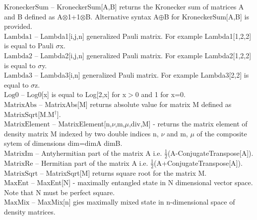 \documentclass[a4paper,11pt]{article}
\begin{document}
\textbf{$ \text{KroneckerSum} $ }-- KroneckerSum[A,B] returns the Kronecker sum of matrices A and B defined as A$\otimes $1+1$\otimes $B. Alternative syntax A$\oplus $B for KroneckerSum[A,B] is provided.$  $\\

\textbf{$ \text{Lambda1} $ }-- Lambda1[i,j,n] generalized Pauli matrix. For example Lambda1[1,2,2] is equal to Pauli $\sigma $x.$  $\\

\textbf{$ \text{Lambda2} $ }-- Lambda2[i,j,n] generalized Pauli matrix. For example Lambda2[1,2,2] is equal to $\sigma $y.$  $\\

\textbf{$ \text{Lambda3} $ }-- Lambda3[i,n] generalized Pauli matrix. For example Lambda3[2,2] is equal to $\sigma $z.$  $\\

\textbf{$ \text{Log0} $ }-- Log0[x] is equal to Log[2,x] for x$>$0 and 1 for x=0.$  $\\

\textbf{$ \text{MatrixAbs} $ }-- MatrixAbs[M] returns absolute value for matrix M defined as MatrixSqrt[M.M$  ^{\dagger }\text{].} $\\

\textbf{$ \text{MatrixElement} $ }-- MatrixElement[n,$\nu $,m,$\mu $,div,M] - returns the matrix element of density matrix M indexed by two double indices n, $\nu $ and m, $\mu $ of the composite sytem of dimensions dim=dimA dimB.$  $\\

\textbf{$ \text{MatrixIm} $ }-- Antyhermitian part of the matrix A i.e. $ \frac{1}{2} $(A-ConjugateTranspose[A]).$  $\\

\textbf{$ \text{MatrixRe} $ }-- Hermitian part of the matrix A i.e. $ \frac{1}{2} $(A+ConjugateTranspose[A]).$  $\\

\textbf{$ \text{MatrixSqrt} $ }-- MatrixSqrt[M] returns square root for the matrix M.$  $\\

\textbf{$ \text{MaxEnt} $ }-- MaxEnt[N] - maximally entangled state in N dimensional vector space. Note that N must be perfect square.$  $\\

\textbf{$ \text{MaxMix} $ }-- MaxMix[n] gies maximally mixed state in n-dimensional space of density matrices.$  $\\
\end{document}

